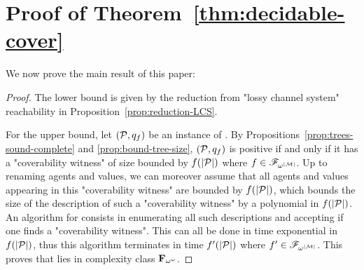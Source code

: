 \section{Proof of Theorem~\ref{thm:decidable-cover}}
\label{app:decidable_cover}
We now prove the main result of this paper:

\decidablecover*

\begin{proof}
	The lower bound is given by the reduction from "lossy channel system" reachability in Proposition~\ref{prop:reduction-LCS}.
	
	For the upper bound, let $(\mathcal{P},q_f)$ be an instance of \COVER. By Propositions~\ref{prop:trees-sound-complete} and \ref{prop:bound-tree-size}, $(\mathcal{P},q_f)$ is positive if and only if it has a "coverability witness" of size bounded by $f(|\mathcal{P}|)$ where $f \in \mathscr{F}_{\omega^{|\mathcal{M}|}}$. Up to renaming agents and values, we can moreover assume that all agents and values appearing in this "coverability witness" are bounded by $f(|\mathcal{P}|)$, which bounds the size of the description of such a "coverability witness" by a polynomial in $f(|\mathcal{P}|)$.
	An algorithm for \COVER consists in enumerating all such descriptions and accepting if one finds a "coverability witness". 
	This can all be done in time exponential in $f(|\mathcal{P}|)$, thus this algorithm terminates in time $f'(|\mathcal{P}|)$ where $f' \in \mathscr{F}_{\omega^{|\mathcal{M}|}}$. This proves that 
	\COVER lies in complexity class $\mathbf{F}_{\omega^\omega}$.
\end{proof}
